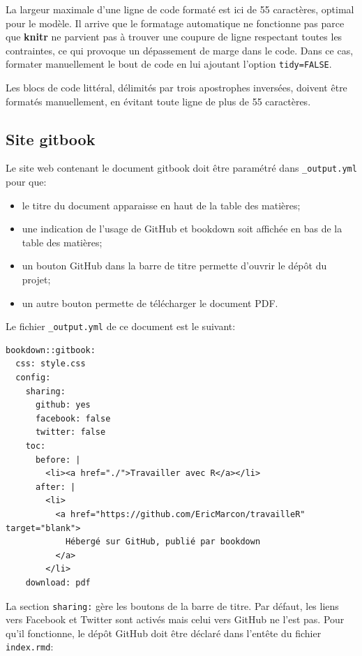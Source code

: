 \documentclass[
  12pt,
  french,
  a4paper,
  extrafontsizes,onecolumn,openright
  ]{memoir}
\providecommand{\tightlist}{%
  \setlength{\itemsep}{0pt}\setlength{\parskip}{0pt}}
\begin{document}
\normalsize

La largeur maximale d'une ligne de code formaté est ici de 55 caractères, optimal pour le modèle.
Il arrive que le formatage automatique ne fonctionne pas parce que \textbf{knitr} ne parvient pas à trouver une coupure de ligne respectant toutes les contraintes, ce qui provoque un dépassement de marge dans le code.
Dans ce cas, formater manuellement le bout de code en lui ajoutant l'option \texttt{tidy=FALSE}.

Les blocs de code littéral, délimités par trois apostrophes inversées, doivent être formatés manuellement, en évitant toute ligne de plus de 55 caractères.

\subsection{Site gitbook}\label{site-gitbook}

Le site web contenant le document gitbook doit être paramétré dans \texttt{\_output.yml} pour que:

\begin{itemize}
\tightlist
\item
  le titre du document apparaisse en haut de la table des matières;
\item
  une indication de l'usage de GitHub et bookdown soit affichée en bas de la table des matières;
\item
  un bouton GitHub dans la barre de titre permette d'ouvrir le dépôt du projet;
\item
  un autre bouton permette de télécharger le document PDF.
\end{itemize}

Le fichier \texttt{\_output.yml} de ce document est le suivant:

\begin{verbatim}
bookdown::gitbook:
  css: style.css
  config:
    sharing:
      github: yes
      facebook: false
      twitter: false
    toc:
      before: |
        <li><a href="./">Travailler avec R</a></li>
      after: |
        <li>
          <a href="https://github.com/EricMarcon/travailleR" target="blank">
            Hébergé sur GitHub, publié par bookdown
          </a>
        </li>
    download: pdf
\end{verbatim}

La section \texttt{sharing:} gère les boutons de la barre de titre.
Par défaut, les liens vers Facebook et Twitter sont activés mais celui vers GitHub ne l'est pas.
Pour qu'il fonctionne, le dépôt GitHub doit être déclaré dans l'entête du fichier \texttt{index.rmd}:
\end{document}
